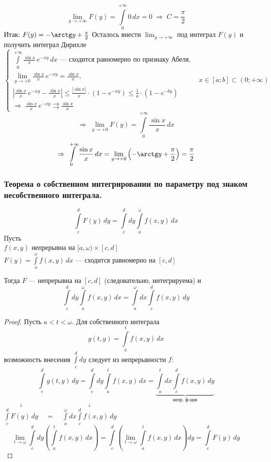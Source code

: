 \begin{example}
    \[ \lim_{y \to +\infty} F(y) = \int\limits_0^{+\infty} 0\,dx = 0 \;\Rightarrow\; C = \frac{\pi}2 \]
    Итак: $F(y) = -\arctg y + \frac{\pi}2$
    Осталось внести $\lim_{y \to +\infty}$ под интеграл $F(y)$ и получить интеграл Дирихле
    \[ \left\{\begin{array}{l} 
    \int\limits_0^{+\infty} \frac{\sin x}x\,e^{-xy}\,dx \text{ --- сходится равномерно по признаку Абеля}, \\
    \lim_{y \to +0} \frac{\sin x}x\,e^{-xy} = \frac{\sin x}x, \\
    \left| \frac{\sin x}x\,e^{-xy} - \frac{\sin x}x \right| \le \frac{|\sin x|}x \cdot \left( 1 - e^{-xy} \right) \le 
    \frac1a \cdot \left( 1 - e^{-by} \right) \\
    \Rightarrow\; \frac{\sin x}x\,e^{-xy} \rightrightarrows \frac{\sin x}x
    \end{array}\right. \ \ \ x \in [a; b] \subset (0; +\infty) \]
    \[ \Rightarrow\; \lim_{y \to +0} F(y) = \int\limits_0^{+\infty} \frac{\sin x}x\,dx \]
    \[ \Rightarrow\; \int\limits_0^{+\infty} \frac{\sin x}x\,dx = 
    \lim_{y \to +0} \left( -\arctg y + \frac{\pi}2 \right) = \frac{\pi}2 \]
\end{example}

\subsubsection{ Теорема о собственном интегрировании по параметру под знаком несобственного интеграла.}
\[ \int\limits_c^d F(y)\,dy = \int\limits_c^d dy \int\limits_a^{\omega} f(x, y)\,dx \]
Пусть \\
\phantom{Пусть} $f(x, y)$ непрерывна на $[a, \omega) \times [c, d]$ \\
\phantom{Пусть} $F(y) = \int\limits_a^{\omega} f(x, y)\,dx$ --- сходится равномерно на $[c, d]$

Тогда $F$ --- непрерывна на $[c, d]$ (следовательно, интегрируема) и 
\[ \int\limits_c^d dy \int\limits_a^{\omega} f(x, y)\,dx = \int\limits_a^{\omega} dx \int\limits_c^d f(x, y)\,dy \]
\begin{proof}
    Пусть $a < t < \omega$. Для собственного интеграла 
    \[ g(t, y) = \int\limits_a^t f(x, y)\,dx \]
    возможность внесения $\int\limits_c^d dy$ следует из непрерывности $f$:
    \[ \int\limits_c^d g(t, y)\,dy = \int\limits_c^d dy \int\limits_a^t f(x, y)\,dx = 
    \underset{\text{непр. ф-ция}}{\underbrace{\int\limits_a^t dx \int\limits_c^d f(x, y)\,dy}} \]
    \phantom{$\int\limits_c^d g(t, y)\,dy =\ \ \ \ \ $} $\overset{\downarrow}{\int\limits_c^d F(y)\,dy} \ \ \ \ \ = \ \ \ \ \ 
    \overset{\downarrow}{\int\limits_a^{\omega} dx \int\limits_c^d f(x, y)\,dy}$
    \[ \lim_{t \to \omega}\int\limits_c^d  dy \left( \int\limits_a^t f(x, y)\,dx \right) = 
    \int\limits_c^d \left( \lim_{t \to \omega} \int\limits_a^t f(x, y)\,dx \right) dy = \int\limits_c^d F(y)\,dy \]
\end{proof}

